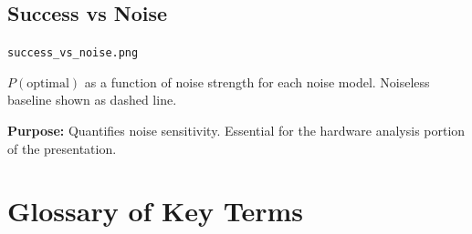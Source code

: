\documentclass[12pt, a4paper]{article}
\begin{document}
\subsection{Success vs Noise}
\texttt{success\_vs\_noise.png}

$P(\text{optimal})$ as a function of noise strength for each noise model.
Noiseless baseline shown as dashed line.

\textbf{Purpose:} Quantifies noise sensitivity. Essential for the hardware
analysis portion of the presentation.


\section{Glossary of Key Terms}
\end{document}
